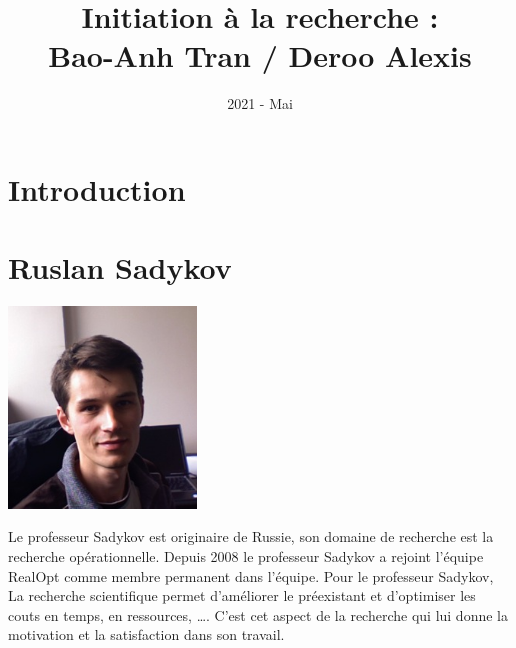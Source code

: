 \documentclass[12pt]{article}
\title{Initiation à la recherche : \\ Bao-Anh Tran / Deroo Alexis}
\date{2021 - Mai}
\begin{document}
    \maketitle
    \tableofcontents
    \newpage

    \section{Introduction}\label{sec:introduction}
    
    \newpage
    \section{Ruslan Sadykov}\label{sec:le-chercheur}
    \begin{center}
        \includegraphics[width=5cm]{image/photo1.jpg}
    \end{center}
    Le professeur Sadykov est originaire de Russie, son domaine de recherche est la recherche opérationnelle. Depuis
    2008 le professeur Sadykov a rejoint l'équipe RealOpt comme membre permanent dans l'équipe. Pour le professeur
    Sadykov, La recherche scientifique permet d'améliorer le préexistant et d'optimiser les couts en temps,
    en ressources, \ldots. C'est cet aspect de la recherche qui lui donne la motivation et la satisfaction dans son
    travail.
\end{document}
